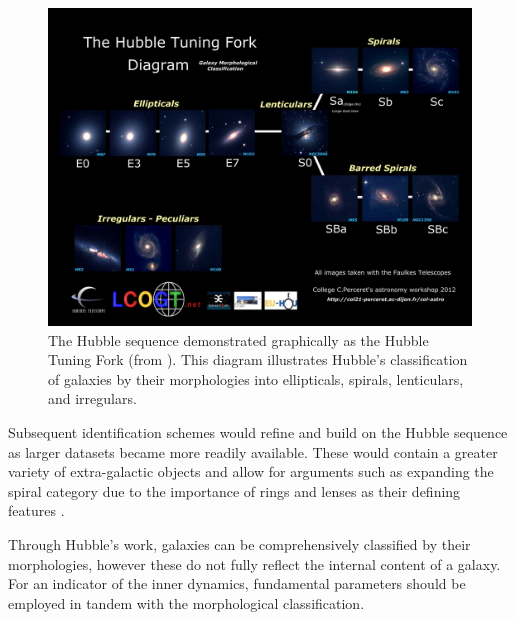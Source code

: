 \documentclass[12pt, twocolumn]{revtex4-1}    %
\begin{document}
\begin{figure}
\includegraphics[width=\textwidth]{introduction/hubble-tuning-fork-diagram}
\caption{The Hubble sequence demonstrated graphically as the Hubble Tuning Fork (from \citealt{hubble_tuning_fork}). This diagram illustrates Hubble's classification of galaxies by their morphologies into ellipticals, spirals, lenticulars, and irregulars.}
\label{fig:hubble_tuning_fork}
\end{figure}


Subsequent identification schemes would refine and build on the Hubble sequence as larger datasets became more readily available. These would contain a greater variety of extra-galactic objects and allow for arguments such as expanding the spiral category due to the importance of rings and lenses as their defining features \citep{1959HDP....53..275D}. 

Through Hubble's work, galaxies can be comprehensively classified by their morphologies, however these do not fully reflect the internal content of a galaxy. For an indicator of the inner dynamics, fundamental parameters should be employed in tandem with the morphological classification. 
\end{document}
